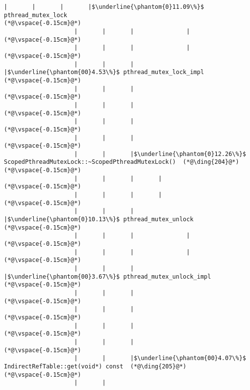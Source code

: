 \begin{lstlisting}[caption=20 viiteparametria (C$\to$Java) , label=profile:C2JBenchmark00206, numberbychapter=true, frame=lines, float, floatplacement=t]
                    |       |       |       |$\underline{\phantom{0}11.09\%}$ pthread_mutex_lock
(*@\vspace{-0.15cm}@*)
                    |       |       |               |
(*@\vspace{-0.15cm}@*)
                    |       |       |               |
(*@\vspace{-0.15cm}@*)
                    |       |       |               |$\underline{\phantom{00}4.53\%}$ pthread_mutex_lock_impl
(*@\vspace{-0.15cm}@*)
                    |       |       |        
(*@\vspace{-0.15cm}@*)
                    |       |       |        
(*@\vspace{-0.15cm}@*)
                    |       |       |
(*@\vspace{-0.15cm}@*)
                    |       |       |
(*@\vspace{-0.15cm}@*)
                    |       |       |$\underline{\phantom{0}12.26\%}$ ScopedPthreadMutexLock::~ScopedPthreadMutexLock()  (*@\ding{204}@*)
(*@\vspace{-0.15cm}@*)
                    |       |       |       |
(*@\vspace{-0.15cm}@*)
                    |       |       |       |
(*@\vspace{-0.15cm}@*)
                    |       |       |       |$\underline{\phantom{0}10.13\%}$ pthread_mutex_unlock
(*@\vspace{-0.15cm}@*)
                    |       |       |               |
(*@\vspace{-0.15cm}@*)
                    |       |       |               |
(*@\vspace{-0.15cm}@*)
                    |       |       |               |$\underline{\phantom{00}3.67\%}$ pthread_mutex_unlock_impl
(*@\vspace{-0.15cm}@*)
                    |       |       |        
(*@\vspace{-0.15cm}@*)
                    |       |       |        
(*@\vspace{-0.15cm}@*)
                    |       |       |
(*@\vspace{-0.15cm}@*)
                    |       |       |
(*@\vspace{-0.15cm}@*)
                    |       |       |$\underline{\phantom{00}4.07\%}$ IndirectRefTable::get(void*) const  (*@\ding{205}@*)
(*@\vspace{-0.15cm}@*)
                    |       |

\end{lstlisting}
